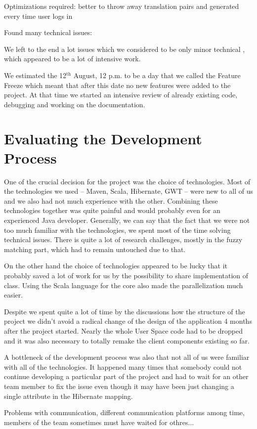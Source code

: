 Optimizations required: better to throw away translation pairs and generated every time user logs in

Found many technical issues: %


We left to the end a lot issues which we considered to be only minor technical , which appeared to be a lot of intensive work.

We estimated the 12$^\mathrm{th}$ August, 12 p.m. to be a day that we called the Feature Freeze which meant that after this date no new features were added to the project. At that time we started an intensive review of already existing code, debugging and working on the documentation. 

\section{Evaluating the Development Process}

One of the crucial decision for the project was the choice of technologies. Most of the technologies we used -- Maven, Scala, Hibernate, GWT -- were new to all of us and we also had not much experience with the other. Combining these technologies together was quite painful and would probably even for an experienced Java developer. Generally, we can say that the fact that we were not too much familiar with the technologies, we spent most of the time solving technical issues. There is quite a lot of research challenges, mostly in the fuzzy matching part, which had to remain untouched due to that.

On the other hand the choice of technologies appeared to be lucky that it probably saved a lot of work for us by the possibility to share implementation of class. Using the Scala language for the core also made the parallelization much easier.

Despite we spent quite a lot of time by the discussions how the structure of the project we didn't avoid a radical change of the design of the application 4 months after the project started. Nearly the whole User Space code had to be dropped and it was also necessary to totally remake the client components existing so far.

A bottleneck of the development process was also that not all of us were familiar with all of the technologies. It happened many times that somebody could not continue developing a particular part of the project and had to wait for an other team member to fix the issue even though it may have been just changing a single attribute in the Hibernate mapping.

Problems with communication, different communication platforms among time, members of the team sometimes must have waited for othres...



